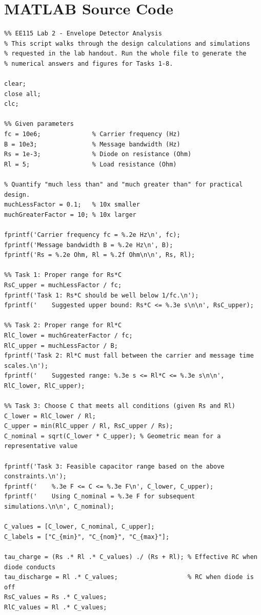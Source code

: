 \documentclass[12pt]{article}
\begin{document}
\section*{MATLAB Source Code}
\begin{verbatim}
%% EE115 Lab 2 - Envelope Detector Analysis
% This script walks through the design calculations and simulations
% requested in the lab handout. Run the whole file to generate the
% numerical answers and figures for Tasks 1-8.

clear;
close all;
clc;

%% Given parameters
fc = 10e6;              % Carrier frequency (Hz)
B = 10e3;               % Message bandwidth (Hz)
Rs = 1e-3;              % Diode on resistance (Ohm)
Rl = 5;                 % Load resistance (Ohm)

% Quantify "much less than" and "much greater than" for practical design.
muchLessFactor = 0.1;   % 10x smaller
muchGreaterFactor = 10; % 10x larger

fprintf('Carrier frequency fc = %.2e Hz\n', fc);
fprintf('Message bandwidth B = %.2e Hz\n', B);
fprintf('Rs = %.2e Ohm, Rl = %.2f Ohm\n\n', Rs, Rl);

%% Task 1: Proper range for Rs*C
RsC_upper = muchLessFactor / fc;
fprintf('Task 1: Rs*C should be well below 1/fc.\n');
fprintf('    Suggested upper bound: Rs*C <= %.3e s\n\n', RsC_upper);

%% Task 2: Proper range for Rl*C
RlC_lower = muchGreaterFactor / fc;
RlC_upper = muchLessFactor / B;
fprintf('Task 2: Rl*C must fall between the carrier and message time scales.\n');
fprintf('    Suggested range: %.3e s <= Rl*C <= %.3e s\n\n', RlC_lower, RlC_upper);

%% Task 3: Choose C that meets all conditions (given Rs and Rl)
C_lower = RlC_lower / Rl;
C_upper = min(RlC_upper / Rl, RsC_upper / Rs);
C_nominal = sqrt(C_lower * C_upper); % Geometric mean for a representative value

fprintf('Task 3: Feasible capacitor range based on the above constraints.\n');
fprintf('    %.3e F <= C <= %.3e F\n', C_lower, C_upper);
fprintf('    Using C_nominal = %.3e F for subsequent simulations.\n\n', C_nominal);

C_values = [C_lower, C_nominal, C_upper];
C_labels = ["C_{min}", "C_{nom}", "C_{max}"];

tau_charge = (Rs .* Rl .* C_values) ./ (Rs + Rl); % Effective RC when diode conducts
tau_discharge = Rl .* C_values;                   % RC when diode is off
RsC_values = Rs .* C_values;
RlC_values = Rl .* C_values;


\end{verbatim}
\end{document}
